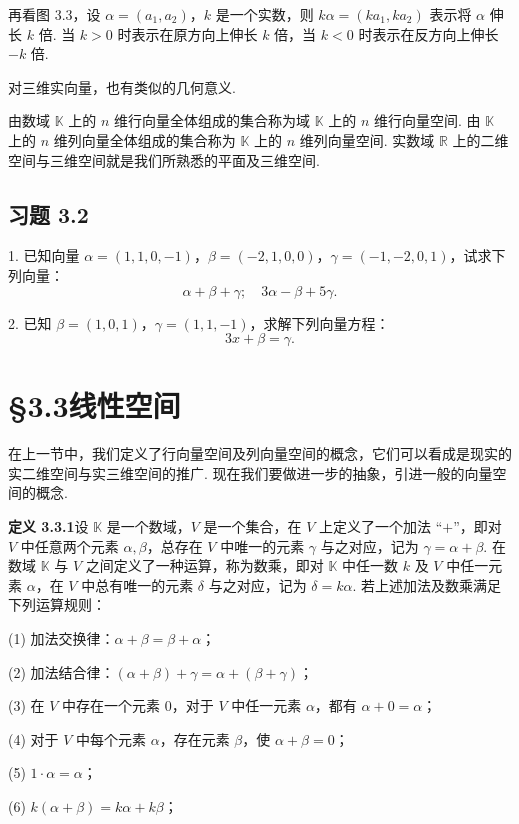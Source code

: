 \documentclass[UTF8,12pt,a4paper,fontset=fandol]{ctexart}
\begin{document}
再看图 3.3，设 $\alpha=(a_1,a_2)$，$k$ 是一个实数，则 $k\alpha=(ka_1,ka_2)$ 表示将 $\alpha$ 伸长 $k$ 倍. 当 $k>0$ 时表示在原方向上伸长 $k$ 倍，当 $k<0$ 时表示在反方向上伸长 $-k$ 倍.

对三维实向量，也有类似的几何意义.

由数域 $\mathbb{K}$ 上的 $n$ 维行向量全体组成的集合称为域 $\mathbb{K}$ 上的 $n$ 维行向量空间. 由 $\mathbb{K}$ 上的 $n$ 维列向量全体组成的集合称为 $\mathbb{K}$ 上的 $n$ 维列向量空间. 实数域 $\mathbb{R}$ 上的二维空间与三维空间就是我们所熟悉的平面及三维空间.

\subsection*{习题 3.2}

1. 已知向量 $\alpha=(1,1,0,-1)$，$\beta=(-2,1,0,0)$，$\gamma=(-1,-2,0,1)$，试求下列向量：
\[
\alpha+\beta+\gamma;\quad 3\alpha-\beta+5\gamma.
\]

2. 已知 $\beta=(1,0,1)$，$\gamma=(1,1,-1)$，求解下列向量方程：
\[
3x+\beta=\gamma.
\]

\section*{§3.3\quad 线性空间}

在上一节中，我们定义了行向量空间及列向量空间的概念，它们可以看成是现实的实二维空间与实三维空间的推广. 现在我们要做进一步的抽象，引进一般的向量空间的概念.

\noindent\textbf{定义 3.3.1}\quad 设 $\mathbb{K}$ 是一个数域，$V$ 是一个集合，在 $V$ 上定义了一个加法 ``$+$''，即对 $V$ 中任意两个元素 $\alpha,\beta$，总存在 $V$ 中唯一的元素 $\gamma$ 与之对应，记为 $\gamma=\alpha+\beta$. 在数域 $\mathbb{K}$ 与 $V$ 之间定义了一种运算，称为数乘，即对 $\mathbb{K}$ 中任一数 $k$ 及 $V$ 中任一元素 $\alpha$，在 $V$ 中总有唯一的元素 $\delta$ 与之对应，记为 $\delta=k\alpha$. 若上述加法及数乘满足下列运算规则：

(1) 加法交换律：$\alpha+\beta=\beta+\alpha$；

(2) 加法结合律：$(\alpha+\beta)+\gamma=\alpha+(\beta+\gamma)$；

(3) 在 $V$ 中存在一个元素 $0$，对于 $V$ 中任一元素 $\alpha$，都有 $\alpha+0=\alpha$；

(4) 对于 $V$ 中每个元素 $\alpha$，存在元素 $\beta$，使 $\alpha+\beta=0$；

(5) $1\cdot\alpha=\alpha$；

(6) $k(\alpha+\beta)=k\alpha+k\beta$；
\end{document}
